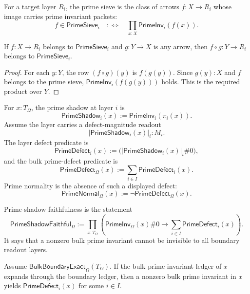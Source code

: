 \begin{definition}
\label{def:rh-prime-sieve-interface}
For a target layer $R_i$, the prime sieve is the class of arrows
$f:X\to R_i$ whose image carries prime invariant packets:
$$
f\in\mathsf{PrimeSieve}_i
\quad:\Longleftrightarrow\quad
\prod_{x:X}\mathsf{PrimeInv}_i(f(x)).
$$
\end{definition}

\begin{theorem}
\label{thm:rh-prime-sieve-precomposition}
If $f:X\to R_i$ belongs to $\mathsf{PrimeSieve}_i$ and $g:Y\to X$ is any
arrow, then $f\circ g:Y\to R_i$ belongs to $\mathsf{PrimeSieve}_i$.
\end{theorem}

\begin{proof}
For each $y:Y$, the row $(f\circ g)(y)$ is $f(g(y))$. Since $g(y):X$ and
$f$ belongs to the prime sieve, $\mathsf{PrimeInv}_i(f(g(y)))$ holds. This
is the required product over $Y$.
\end{proof}

\begin{definition}
\label{def:rh-prime-shadow-defect-interface}
For $x:T_{\Omega}$, the prime shadow at layer $i$ is
$$
\mathsf{PrimeShadow}_i(x)
:=
\mathsf{PrimeInv}_i(\pi_i(x)).
$$
Assume the layer carries a defect-magnitude readout
$$
|\mathsf{PrimeShadow}_i(x)|_i:M_i.
$$
The layer defect predicate is
$$
\mathsf{PrimeDefect}_i(x)
:=
\bigl(|\mathsf{PrimeShadow}_i(x)|_i\#0\bigr),
$$
and the bulk prime-defect predicate is
$$
\mathsf{PrimeDefect}_{\Omega}(x)
:=
\sum_{i\in I}\mathsf{PrimeDefect}_i(x).
$$
Prime normality is the absence of such a displayed defect:
$$
\mathsf{PrimeNormal}_{\Omega}(x)
:=
\neg\mathsf{PrimeDefect}_{\Omega}(x).
$$
\end{definition}

\begin{definition}
\label{def:rh-prime-shadow-faithfulness-interface}
Prime-shadow faithfulness is the statement
$$
\mathsf{PrimeShadowFaithful}_{\Omega}
:=
\prod_{x:T_{\Omega}}
\left(
\mathsf{PrimeInv}_{\Omega}(x)\#0
\to
\sum_{i\in I}\mathsf{PrimeDefect}_i(x)
\right).
$$
It says that a nonzero bulk prime invariant cannot be invisible to all
boundary readout layers.
\end{definition}

\begin{theorem}
\label{thm:rh-ledgered-prime-expansion-shadow-detection}
Assume $\mathsf{BulkBoundaryExact}_{\Omega}(T_{\Omega})$. If the bulk
prime invariant ledger of $x$ expands through the boundary ledger, then a
nonzero bulk prime invariant in $x$ yields $\mathsf{PrimeDefect}_i(x)$ for
some $i\in I$.
\end{theorem}

